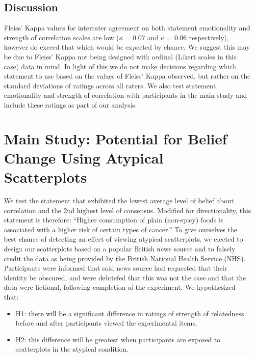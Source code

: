 \documentclass[manuscript,screen,review,anonymous]{acmart}
\providecommand{\tightlist}{%
  \setlength{\itemsep}{0pt}\setlength{\parskip}{0pt}}\usepackage{longtable,booktabs,array}
\begin{document}
\subsection{Discussion}\label{sec-discussion-pre}

Fleiss' Kappa values for interrater agreement on both statement
emotionality and strength of correlation scales are low (\(\kappa\) =
0.07 and \(\kappa\) = 0.06 respectively), however do exceed that which
would be expected by chance. We suggest this may be due to Fleiss' Kappa
not being designed with ordinal (Likert scales in this case) data in
mind. In light of this we do not make decisions regarding which
statement to use based on the values of Fleiss' Kappa observed, but
rather on the standard deviations of ratings across all raters. We also
test statement emotionality and strength of correlation with
participants in the main study and include these ratings as part of our
analysis.

\section{Main Study: Potential for Belief Change Using Atypical
Scatterplots}\label{sec-main-study}

We test the statement that exhibited the lowest average level of belief
about correlation and the 2nd highest level of consensus. Modified for
directionality, this statement is therefore: ``Higher consumption of
plain (non-spicy) foods is associated with a higher risk of certain
types of cancer.'' To give ourselves the best chance of detecting an
effect of viewing atypical scatterplots, we elected to design our
scatterplots based on a popular British news source and to falsely
credit the data as being provided by the British National Health Service
(NHS). Participants were informed that said news source had requested
that their identity be obscured, and were debriefed that this was not
the case and that the data were fictional, following completion of the
experiment. We hypothesized that:

\begin{itemize}
\tightlist
\item
  H1: there will be a significant difference in ratings of strength of
  relatedness before and after participants viewed the experimental
  items.
\item
  H2: this difference will be greatest when participants are exposed to
  scatterplots in the atypical condition.
\end{itemize}
\end{document}
